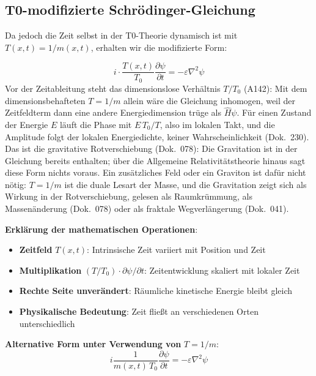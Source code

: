 	\subsection{T0-modifizierte Schrödinger-Gleichung}
	
	Da jedoch die Zeit selbst in der T0-Theorie dynamisch ist mit $T(x,t) = 1/m(x,t)$, erhalten wir die modifizierte Form:
	
	\begin{equation}
		\boxed{i \cdot \frac{T(x,t)}{T_0} \frac{\partial\psi}{\partial t} = -\varepsilon \nabla^2 \psi}
		\label{eq:t0_modified_schrodinger}
	\end{equation}
	Vor der Zeitableitung steht das dimensionslose Verhältnis $T/T_0$ (A142): Mit dem dimensionsbehafteten $T=1/m$ allein wäre die Gleichung inhomogen, weil der Zeitfeldterm dann eine andere Energiedimension trüge als $\hat H\psi$. Für einen Zustand der Energie $E$ läuft die Phase mit $E\,T_0/T$, also im lokalen Takt, und die Amplitude folgt der lokalen Energiedichte, keiner Wahrscheinlichkeit (Dok.~230). Das ist die gravitative Rotverschiebung (Dok.~078): Die Gravitation ist in der Gleichung bereits enthalten; über die Allgemeine Relativitätstheorie hinaus sagt diese Form nichts voraus. Ein zusätzliches Feld oder ein Graviton ist dafür nicht nötig: $T=1/m$ ist die duale Lesart der Masse, und die Gravitation zeigt sich als Wirkung in der Rotverschiebung, gelesen als Raumkrümmung, als Massenänderung (Dok.~078) oder als fraktale Wegverlängerung (Dok.~041).
	
	\textbf{Erklärung der mathematischen Operationen}:
	\begin{itemize}
		\item \textbf{Zeitfeld} $T(x,t)$: Intrinsische Zeit variiert mit Position und Zeit
		\item \textbf{Multiplikation} $(T/T_0) \cdot \partial\psi/\partial t$: Zeitentwicklung skaliert mit lokaler Zeit
		\item \textbf{Rechte Seite unverändert}: Räumliche kinetische Energie bleibt gleich
		\item \textbf{Physikalische Bedeutung}: Zeit fließt an verschiedenen Orten unterschiedlich
	\end{itemize}
	
	\textbf{Alternative Form unter Verwendung von} $T = 1/m$:
	\begin{equation}
		i \frac{1}{m(x,t)\,T_0} \frac{\partial\psi}{\partial t} = -\varepsilon \nabla^2 \psi
		\label{eq:t0_schrodinger_mass}
	\end{equation}
	
